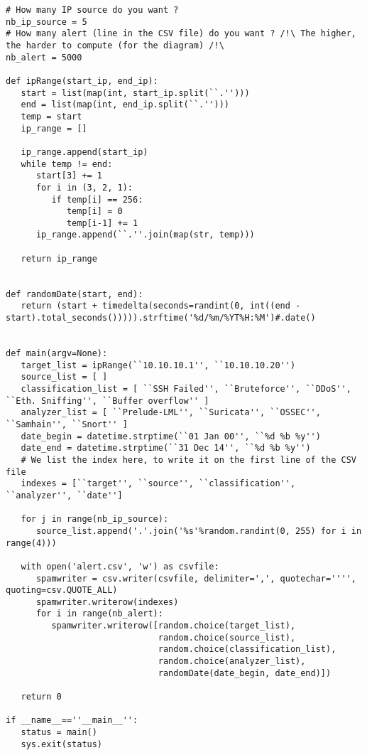 \documentclass{koala-en}
\begin{document}
\begin{lstlisting}
# How many IP source do you want ?
nb_ip_source = 5
# How many alert (line in the CSV file) do you want ? /!\ The higher, the harder to compute (for the diagram) /!\
nb_alert = 5000

def ipRange(start_ip, end_ip):
   start = list(map(int, start_ip.split(``.'')))
   end = list(map(int, end_ip.split(``.'')))
   temp = start
   ip_range = []

   ip_range.append(start_ip)
   while temp != end:
      start[3] += 1
      for i in (3, 2, 1):
         if temp[i] == 256:
            temp[i] = 0
            temp[i-1] += 1
      ip_range.append(``.''.join(map(str, temp)))

   return ip_range


def randomDate(start, end):
   return (start + timedelta(seconds=randint(0, int((end - start).total_seconds())))).strftime('%d/%m/%YT%H:%M')#.date()


def main(argv=None):
   target_list = ipRange(``10.10.10.1'', ``10.10.10.20'')
   source_list = [ ]
   classification_list = [ ``SSH Failed'', ``Bruteforce'', ``DDoS'', ``Eth. Sniffing'', ``Buffer overflow'' ]
   analyzer_list = [ ``Prelude-LML'', ``Suricata'', ``OSSEC'', ``Samhain'', ``Snort'' ]
   date_begin = datetime.strptime(``01 Jan 00'', ``%d %b %y'')
   date_end = datetime.strptime(``31 Dec 14'', ``%d %b %y'')
   # We list the index here, to write it on the first line of the CSV file
   indexes = [``target'', ``source'', ``classification'', ``analyzer'', ``date'']

   for j in range(nb_ip_source):
      source_list.append('.'.join('%s'%random.randint(0, 255) for i in range(4)))

   with open('alert.csv', 'w') as csvfile:
      spamwriter = csv.writer(csvfile, delimiter=',', quotechar='''', quoting=csv.QUOTE_ALL)
      spamwriter.writerow(indexes)
      for i in range(nb_alert):
         spamwriter.writerow([random.choice(target_list),
                              random.choice(source_list),
                              random.choice(classification_list),
                              random.choice(analyzer_list),
                              randomDate(date_begin, date_end)])

   return 0

if __name__==''__main__'':
   status = main()
   sys.exit(status)
\end{lstlisting}
\end{document}
